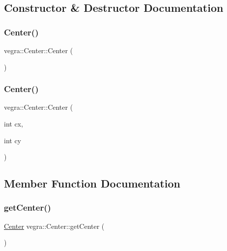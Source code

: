 \subsection{Constructor \& Destructor Documentation}
\mbox{\label{structvegra_1_1Center_aba154fa620d3887422c314862d6d945d}} 
\subsubsection{\texorpdfstring{Center()}{Center()}\hspace{0.1cm}{\footnotesize\ttfamily [1/2]}}
{\footnotesize\ttfamily vegra\+::\+Center\+::\+Center (\begin{DoxyParamCaption}{ }\end{DoxyParamCaption})\hspace{0.3cm}{\ttfamily [inline]}}

\mbox{\label{structvegra_1_1Center_a9431449d3f25bb9fccba76772aef273a}} 
\subsubsection{\texorpdfstring{Center()}{Center()}\hspace{0.1cm}{\footnotesize\ttfamily [2/2]}}
{\footnotesize\ttfamily vegra\+::\+Center\+::\+Center (\begin{DoxyParamCaption}\item[{int}]{cx,  }\item[{int}]{cy }\end{DoxyParamCaption})\hspace{0.3cm}{\ttfamily [inline]}}



\subsection{Member Function Documentation}
\mbox{\label{structvegra_1_1Center_a70731af46bc0f1fb16a5a75027b51105}} 
\subsubsection{\texorpdfstring{get\+Center()}{getCenter()}}
{\footnotesize\ttfamily \mbox{\hyperlink{structvegra_1_1Center}{Center}} vegra\+::\+Center\+::get\+Center (\begin{DoxyParamCaption}{ }\end{DoxyParamCaption})\hspace{0.3cm}{\ttfamily [inline]}}

